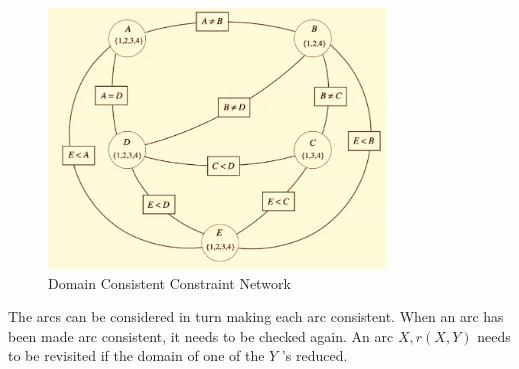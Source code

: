 \documentclass[a4paper]{article}
\theoremstyle{plain}
\theoremstyle{definition}
\newtheorem{defn}{Definition}[section]
\theoremstyle{remark}
\begin{document}
\begin{figure}[H]
	\centering
	\includegraphics[width=0.8\textwidth]{one.png}
	\caption{Domain Consistent Constraint Network}
	\label{fig:one-png}
\end{figure}
\begin{tcolorbox}[colback=black!3!white,colframe=black!60!white,title=\begin{defn}Arc Consistency Algorithm \label{Arc Consistency Algorithm}\end{defn}]
The arcs can be considered in turn making each arc consistent. When an arc has been made arc consistent, it needs to be checked again. An arc $X,r(X,Y)$ needs to be revisited if the domain of one of the $Y$ 's reduced. 
\end{tcolorbox}
\end{document}
